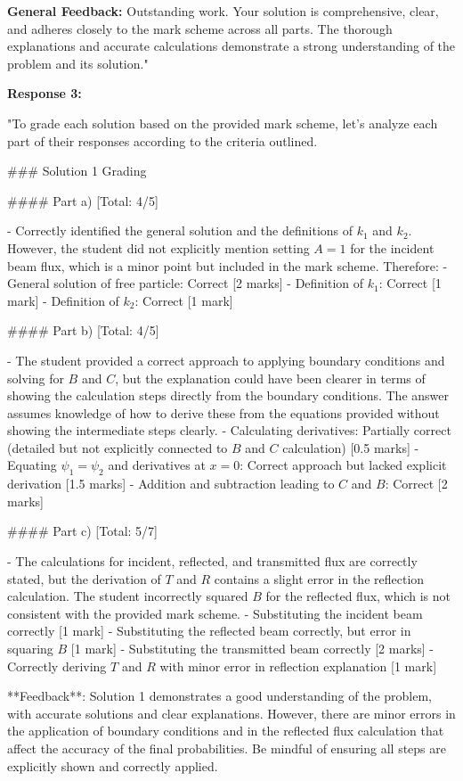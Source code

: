\documentclass[a4paper,11pt]{article}
\begin{document}
\textbf{General Feedback:} Outstanding work. Your solution is comprehensive, clear, and adheres closely to the mark scheme across all parts. The thorough explanations and accurate calculations demonstrate a strong understanding of the problem and its solution."

\textbf{Response 3:}

"To grade each solution based on the provided mark scheme, let's analyze each part of their responses according to the criteria outlined.

### Solution 1 Grading

#### Part a) [Total: 4/5]

- Correctly identified the general solution and the definitions of \(k_1\) and \(k_2\). However, the student did not explicitly mention setting \(A = 1\) for the incident beam flux, which is a minor point but included in the mark scheme. Therefore:
  - General solution of free particle: Correct [2 marks]
  - Definition of \(k_1\): Correct [1 mark]
  - Definition of \(k_2\): Correct [1 mark]

#### Part b) [Total: 4/5]

- The student provided a correct approach to applying boundary conditions and solving for \(B\) and \(C\), but the explanation could have been clearer in terms of showing the calculation steps directly from the boundary conditions. The answer assumes knowledge of how to derive these from the equations provided without showing the intermediate steps clearly.
  - Calculating derivatives: Partially correct (detailed but not explicitly connected to \(B\) and \(C\) calculation) [0.5 marks]
  - Equating \(\psi_1 = \psi_2\) and derivatives at \(x = 0\): Correct approach but lacked explicit derivation [1.5 marks]
  - Addition and subtraction leading to \(C\) and \(B\): Correct [2 marks]

#### Part c) [Total: 5/7]

- The calculations for incident, reflected, and transmitted flux are correctly stated, but the derivation of \(T\) and \(R\) contains a slight error in the reflection calculation. The student incorrectly squared \(B\) for the reflected flux, which is not consistent with the provided mark scheme.
  - Substituting the incident beam correctly [1 mark]
  - Substituting the reflected beam correctly, but error in squaring \(B\) [1 mark]
  - Substituting the transmitted beam correctly [2 marks]
  - Correctly deriving \(T\) and \(R\) with minor error in reflection explanation [1 mark]

**Feedback**: Solution 1 demonstrates a good understanding of the problem, with accurate solutions and clear explanations. However, there are minor errors in the application of boundary conditions and in the reflected flux calculation that affect the accuracy of the final probabilities. Be mindful of ensuring all steps are explicitly shown and correctly applied.
\end{document}

